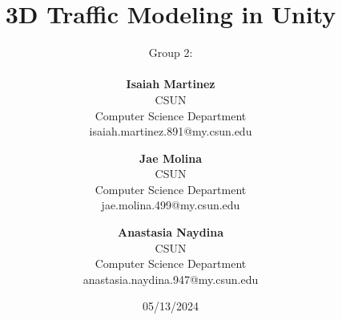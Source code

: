 \documentclass[a4paper,10pt]{article}
\begin{document}
%
\title{3D Traffic Modeling in Unity}



	\author{
	Group 2:\\\\
	\textbf{Isaiah Martinez} \\ CSUN \\ Computer Science Department \\ isaiah.martinez.891@my.csun.edu \\
	\and
	\textbf{Jae Molina} \\ CSUN \\ Computer Science Department \\ jae.molina.499@my.csun.edu \\
	\and
	\textbf{Anastasia Naydina} \\ CSUN \\ Computer Science Department \\ anastasia.naydina.947@my.csun.edu
	}

          
    \date{05/13/2024}

    \maketitle
    
    \newpage
   
    \tableofcontents
 
    \newpage
    
    

    

    

    

    

    

    \newpage
\end{document}
